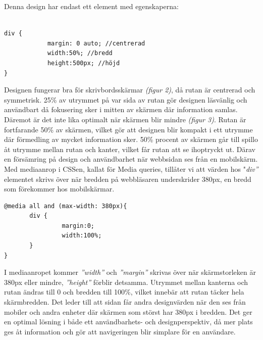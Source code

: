 \documentclass[11pt]{article}
\begin{document}
\vspace{1cm}
Denna design har endast ett element med egenskaperna:

\vspace{0.3cm}
\begin{verbatim}

div {	
	        margin: 0 auto; //centrerad
	        width:50%; //bredd
	        height:500px; //höjd
}
\end{verbatim}
\vspace{0.3cm}
Designen fungerar bra för skrivbordsskärmar \textit{(figur 2)}, då rutan är centrerad och symmetrisk. 25\% av utrymmet på var sida av rutan gör designen läsvänlig och användbart då fokusering sker i mitten av skärmen där information samlas. Däremot är det inte lika optimalt när skärmen blir mindre \textit{(figur 3)}. Rutan är fortfarande 50\% av skärmen, vilket gör att  designen blir kompakt i ett utrymme där förmedling av mycket information sker. 50\% procent av skärmen går till spillo åt utrymme mellan rutan och kanter, vilket får rutan att se ihoptryckt ut. Därav en försämring på design och användbarhet när webbsidan ses från en mobilskärm.
\newpage
Med mediaanrop i CSSen, kallat för Media queries, tillåter vi att värden hos "\textit{div”} elementet skrivs över när bredden på webbläsaren underskrider 380px, en bredd som förekommer hos mobilskärmar.

\vspace{0.5cm}
\begin{verbatim}
@media all and (max-width: 380px){
       div {
                margin:0;
                width:100%;
       }
}
\end{verbatim}
\vspace{0.5cm}

I mediaanropet kommer \textit{”width”} och \textit{”margin”} skrivas över när skärmstorleken är 380px eller mindre, \textit{”height”} förblir detsamma. Utrymmet mellan kanterna och rutan ändras till 0 och bredden till 100\%, vilket innebär att rutan täcker hela skärmbredden. Det leder till att sidan får andra designvärden när den ses från mobiler och andra enheter där skärmen som störst har 380px i bredden. Det ger en optimal lösning i både ett användbarhets- och designperspektiv, då mer plats ges åt information och gör att navigeringen blir simplare för en användare.
\end{document}

